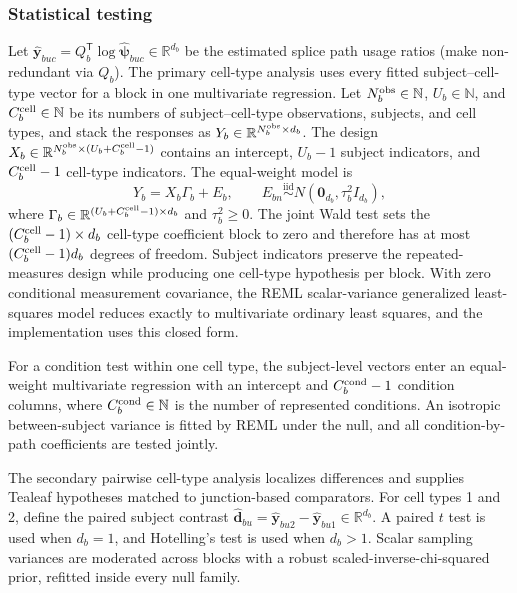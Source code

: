 \documentclass[11pt]{article}
\begin{document}
\subsubsection*{Statistical testing}

Let \(\widehat{\bm y}_{buc}=Q_b^{\mathsf T}\log\widehat{\bm\psi}_{buc}\in\mathbb R^{d_b}\) be the estimated splice path usage ratios (make non-redundant via $Q_b$). The primary cell-type analysis uses every fitted subject--cell-type vector for a block in one multivariate regression. Let \(N_b^{\rm obs}\in\mathbb N\), \(U_b\in\mathbb N\), and \(C_b^{\rm cell}\in\mathbb N\) be its numbers of subject--cell-type observations, subjects, and cell types, and stack the responses as \(Y_b\in\mathbb R^{N_b^{\rm obs}\times d_b}\). The design \(X_b\in\mathbb R^{N_b^{\rm obs}\times(U_b+C_b^{\rm cell}-1)}\) contains an intercept, \(U_b-1\) subject indicators, and \(C_b^{\rm cell}-1\) cell-type indicators. The equal-weight model is \[Y_b=X_b\Gamma_b+E_b,\qquad E_{bn}\overset{\mathrm{iid}}\sim N(\bm0_{d_b},\tau_b^2I_{d_b}),\] where \(\Gamma_b\in\mathbb R^{(U_b+C_b^{\rm cell}-1)\times d_b}\) and \(\tau_b^2\geq0\). The joint Wald test sets the \((C_b^{\rm cell}-1)\times d_b\) cell-type coefficient block to zero and therefore has at most \((C_b^{\rm cell}-1)d_b\) degrees of freedom. Subject indicators preserve the repeated-measures design while producing one cell-type hypothesis per block. With zero conditional measurement covariance, the REML scalar-variance generalized least-squares model reduces exactly to multivariate ordinary least squares, and the implementation uses this closed form.

For a condition test within one cell type, the subject-level vectors enter an equal-weight multivariate regression with an intercept and \(C_b^{\rm cond}-1\) condition columns, where \(C_b^{\rm cond}\in\mathbb N\) is the number of represented conditions. An isotropic between-subject variance is fitted by REML under the null, and all condition-by-path coefficients are tested jointly.

The secondary pairwise cell-type analysis localizes differences and supplies Tealeaf hypotheses matched to junction-based comparators. For cell types 1 and 2, define the paired subject contrast \(\widehat{\bm d}_{bu}=\widehat{\bm y}_{bu2}-\widehat{\bm y}_{bu1}\in\mathbb R^{d_b}\). A paired \(t\) test is used when \(d_b=1\), and Hotelling's test is used when \(d_b>1\). Scalar sampling variances are moderated across blocks with a robust scaled-inverse-chi-squared prior, refitted inside every null family.
\end{document}
